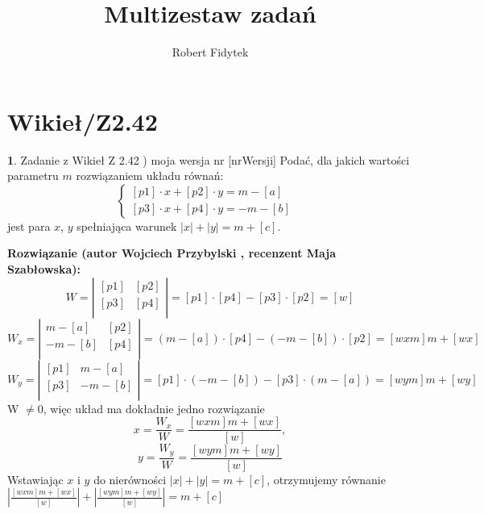 \documentclass[12pt, a4paper]{article}
\title{Multizestaw zadań}
\author{Robert Fidytek}
\date{}
\theoremstyle{definition} %
\newtheorem{zad}{}
\newcommand{\kategoria}[1]{\section{#1}} %
\newcommand{\zadStart}[1]{\begin{zad}#1\newline} %
\newcommand{\zadStop}{\end{zad}}   %
\newcommand{\rozwStart}[2]{\noindent \textbf{Rozwiązanie (autor #1 , recenzent #2): }\newline} %
\begin{document}
\maketitle


\kategoria{Wikieł/Z2.42}
\zadStart{Zadanie z Wikieł Z 2.42 ) moja wersja nr [nrWersji]}
Podać, dla jakich wartości parametru $m$ rozwiązaniem układu równań:
$$
 \left\{ \begin{array}{ll}
[p1]\cdot x+[p2]\cdot y=m-[a] & \\
{[p3]}\cdot x+[p4]\cdot y=-m-[b]  & 
\end{array} \right.
$$
jest para $x$, $y$ spełniająca warunek $|x|+|y|=m+[c]$.
\zadStop
\rozwStart{Wojciech Przybylski}{Maja Szabłowska}
$$
W =
\left| \begin{array}{ccc}
[p1] & [p2]  \\
{[p3]} & [p4]  \\
\end{array} \right| =[p1]\cdot[p4]-[p3]\cdot[p2]=[w]
$$
$$
W_{x} =
\left| \begin{array}{ccc}
m-[a] & [p2]  \\
-m-[b] & [p4]  \\
\end{array} \right| =(m-[a])\cdot[p4]-(-m-[b])\cdot[p2]=[wxm]m+[wx]
$$
$$
W_{y} =
\left| \begin{array}{ccc}
[p1] & m-[a] \\
{[p3]} & -m-[b]  \\
\end{array} \right| =[p1]\cdot(-m-[b])-[p3]\cdot(m-[a])=[wym]m+[wy]
$$
W $\neq 0$, więc układ ma dokładnie jedno rozwiązanie
$$x=\frac{W_{x}}{W}=\frac{[wxm]m+[wx]}{[w]},$$
$$y=\frac{W_{y}}{W}=\frac{[wym]m+[wy]}{[w]}$$
Wstawiając $x$ i $y$ do nierówności $|x|+|y|=m+[c]$, otrzymujemy równanie
$|\frac{[wxm]m+[wx]}{[w]}|+|\frac{[wym]m+[wy]}{[w]}|=m+[c]$
\end{document}
